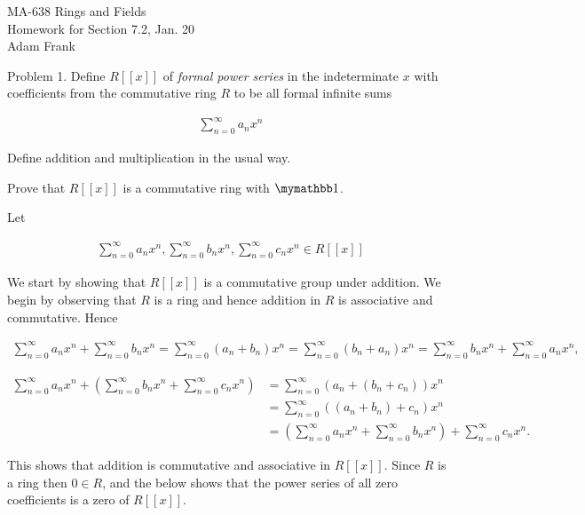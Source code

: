\documentclass{article}
\begin{document}
  \begin{center} \Large
    MA-638 Rings and Fields\\
    Homework for Section 7.2, Jan. 20 \\
    Adam Frank
  \end{center}

  \vspace{1cm}

  {\Large \color{Sepia} Problem 1.  Define $R[[x]]$ of {\it formal power series} in the indeterminate $x$ with coefficients from the commutative ring $R$ to be all formal infinite sums

  \begin{align*}
    \sum_{n=0}^\infty a_nx^n
  \end{align*}

  Define addition and multiplication in the usual way.

  Prove that $R[[x]]$ is a commutative ring with $\mymathbb 1$.

  }

  \vspace{1cm}

  Let

  \begin{align*}
    \sum_{n=0}^\infty a_nx^n,\sum_{n=0}^\infty b_nx^n,\sum_{n=0}^\infty c_nx^n \in R[[x]]
  \end{align*}

  We start by showing that $R[[x]]$ is a commutative group under addition.     We begin by observing that $R$ is a ring and hence addition in $R$ is associative and commutative.  Hence

  \begin{align*}
    \sum_{n=0}^\infty a_nx^n + \sum_{n=0}^\infty b_nx^n = \sum_{n=0}^\infty (a_n+b_n)x^n = \sum_{n=0}^\infty (b_n+a_n)x^n = \sum_{n=0}^\infty b_nx^n+\sum_{n=0}^\infty a_nx^n,
  \end{align*}

  \begin{align*}
    \sum_{n=0}^\infty a_nx^n+\left(\sum_{n=0}^\infty b_nx^n+\sum_{n=0}^\infty c_nx^n\right) &= \sum_{n=0}^\infty (a_n+(b_n+c_n))x^n \\
    &= \sum_{n=0}^\infty ((a_n+b_n)+c_n)x^n \\
    &= \left(\sum_{n=0}^\infty a_nx^n+\sum_{n=0}^\infty b_nx^n\right)+\sum_{n=0}^\infty c_nx^n.
  \end{align*}

  This shows that addition is commutative and associative in $R[[x]]$.  Since $R$ is a ring then $0\in R$, and the below shows that the power series of all zero coefficients is a zero of $R[[x]]$.
\end{document}
